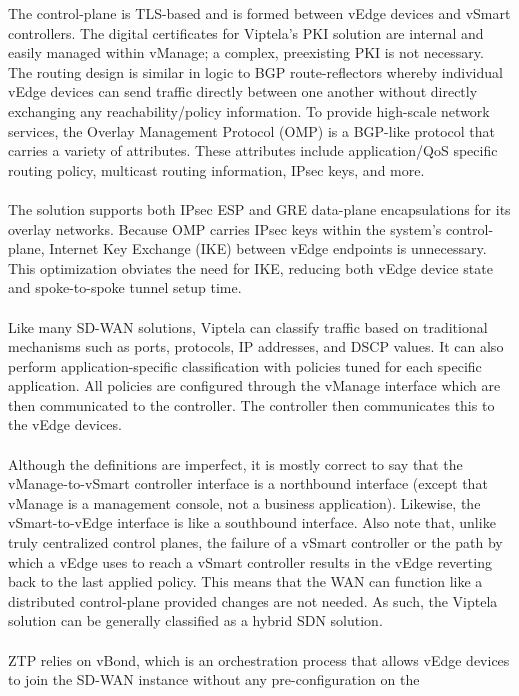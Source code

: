 The control-plane is TLS-based and is formed between vEdge devices and vSmart
controllers. The digital certificates for Viptela’s PKI solution are internal
and easily managed within vManage; a complex, preexisting PKI is not
necessary. The routing design is similar in logic to BGP route-reflectors
whereby individual vEdge devices can send traffic directly between one another
without directly exchanging any reachability/policy information. To provide
high-scale network services, the Overlay Management Protocol (OMP) is a
BGP-like protocol that carries a variety of attributes. These attributes
include application/QoS specific routing policy, multicast routing
information, IPsec keys, and more.
\\ \\
The solution supports both IPsec ESP and GRE data-plane encapsulations for its
overlay networks. Because OMP carries IPsec keys within the system’s
control-plane, Internet Key Exchange (IKE) between vEdge endpoints is
unnecessary. This optimization obviates the need for IKE, reducing both vEdge
device state and spoke-to-spoke tunnel setup
time.
\\ \\
Like many SD-WAN solutions, Viptela can classify traffic based on traditional
mechanisms such as ports, protocols, IP addresses, and DSCP values. It can
also perform application-specific classification with policies tuned for each
specific application. All policies are configured through the vManage
interface which are then communicated to the controller. The controller then
communicates this to the vEdge devices.
\\ \\
Although the definitions are imperfect, it is mostly correct to say that the
vManage-to-vSmart controller interface is a northbound interface (except that
vManage is a management console, not a business application). Likewise, the
vSmart-to-vEdge interface is like a southbound interface. Also note that,
unlike truly centralized control planes, the failure of a vSmart controller or
the path by which a vEdge uses to reach a vSmart controller results in the
vEdge reverting back to the last applied policy. This means that the WAN can
function like a distributed control-plane provided changes are not needed. As
such, the Viptela solution can be generally classified as a hybrid SDN solution.
\\ \\
ZTP relies on vBond, which is an orchestration process that allows vEdge
devices to join the SD-WAN instance without any pre-configuration on the

